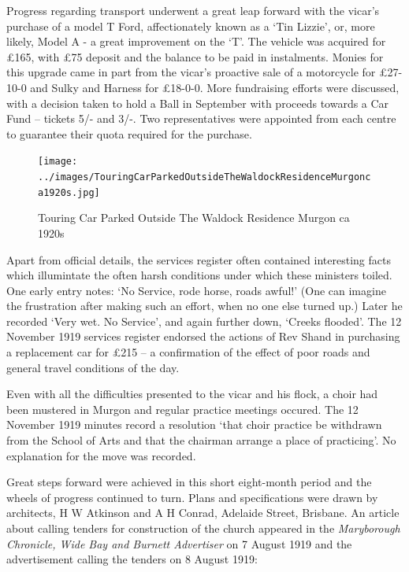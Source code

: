 \smallskip


Progress regarding transport underwent a great leap forward with the vicar's purchase of a model T Ford, affectionately known as a `Tin Lizzie', or, more likely, Model A - a great improvement on the `T'. The vehicle was acquired for \pounds165, with \pounds75 deposit and the balance to be paid in instalments. Monies for this upgrade came in part from the vicar's proactive sale of a motorcycle for \pounds27-10-0 and Sulky and Harness for \pounds18-0-0. More fundraising efforts were discussed, with a decision taken to hold a Ball in September with proceeds towards a Car Fund -- tickets 5/- and 3/-. Two representatives were appointed from each centre to guarantee their quota required for the purchase.









\begin{figure}[!htb]
\begin{center}
\texttt{[image: ../images/TouringCarParkedOutsideTheWaldockResidenceMurgonca1920s.jpg]}
\caption{Touring Car Parked Outside The Waldock Residence Murgon ca 1920s}
\end{center}
\end{figure}




Apart from official details, the services register often contained interesting facts which illumintate the often harsh conditions under which these ministers toiled. One early entry notes: `No Service, rode horse, roads awful!' (One can imagine the frustration after making such an effort, when no one else turned up.) Later he recorded `Very wet. No Service', and again further down, `Creeks flooded'. The 12 November 1919 services register endorsed the actions of Rev Shand in purchasing a replacement car for \pounds215 -- a confirmation of the effect of poor roads and general travel conditions of the day.



Even with all the difficulties presented to the vicar and his flock, a choir had been mustered in Murgon and regular practice meetings occured. The 12 November 1919 minutes record a resolution `that choir practice be withdrawn from the School of Arts and that the chairman arrange a place of practicing'. No explanation for the move was recorded.



Great steps forward were achieved in this short eight-month period and the wheels of progress continued to turn. Plans and specifications were drawn by architects, H W Atkinson and A H Conrad, Adelaide Street, Brisbane. An article about calling tenders for construction of the church appeared in the \emph{Maryborough Chronicle, Wide Bay and Burnett Advertiser} on 7 August 1919 and the advertisement calling the tenders on 8 August 1919:



